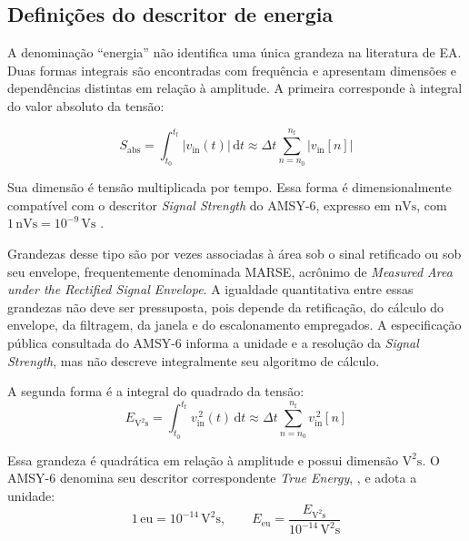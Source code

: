 \subsection{Definições do descritor de energia}
\label{v2:subsec:energia_ea}

A denominação ``energia'' não identifica uma única grandeza na literatura de EA. Duas formas integrais são encontradas com frequência e apresentam dimensões e dependências distintas em relação à amplitude. A primeira corresponde à integral do valor absoluto da tensão:

\begin{equation}
	S_{\mathrm{abs}} = \int_{t_0}^{t_{\mathrm{f}}} \left| v_{\mathrm{in}}(t) \right| \,\mathrm{d}t \approx \Delta t \sum_{n=n_0}^{n_{\mathrm{f}}} \left| v_{\mathrm{in}}[n] \right|
	\label{v2:eq:integral_sinal_retificado}
\end{equation}

Sua dimensão é tensão multiplicada por tempo. Essa forma é dimensionalmente compatível com o descritor \textit{Signal Strength} do AMSY-6, expresso em \(\mathrm{nVs}\), com \(1\,\mathrm{nVs} = 10^{-9}\,\mathrm{Vs}\) \cite{vallen2022}. 

Grandezas desse tipo são por vezes associadas à área sob o sinal retificado ou sob seu envelope, frequentemente denominada MARSE, acrônimo de \textit{Measured Area under the Rectified Signal Envelope}. A igualdade quantitativa entre essas grandezas não deve ser pressuposta, pois depende da retificação, do cálculo do envelope, da filtragem, da janela e do escalonamento empregados. A especificação pública consultada do AMSY-6 informa a unidade e a resolução da \textit{Signal Strength}, mas não descreve integralmente seu algoritmo de cálculo.

A segunda forma é a integral do quadrado da tensão: 
\begin{equation}
	E_{\mathrm{V^2s}} = \int_{t_0}^{t_{\mathrm{f}}} v_{\mathrm{in}}^{\,2}(t) \,\mathrm{d}t \approx \Delta t \sum_{n=n_0}^{n_{\mathrm{f}}} v_{\mathrm{in}}^{\,2}[n]
	\label{v2:eq:true_energy}
\end{equation}

Essa grandeza é quadrática em relação à amplitude e possui dimensão \(\mathrm{V^2s}\). O AMSY-6 denomina seu descritor correspondente \textit{True Energy}, \cite{vallen2022}, e adota a unidade:
\begin{equation}
	1\,\mathrm{eu} = 10^{-14}\,\mathrm{V^2s}, \qquad E_{\mathrm{eu}} = \frac{E_{\mathrm{V^2s}}} {10^{-14}\,\mathrm{V^2s}}
	\label{v2:eq:unidade_true_energy}
\end{equation}

